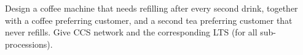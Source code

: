 \begin{exercise}
	Design a coffee machine that needs refilling after every second drink, together with a coffee preferring customer, and a second tea preferring customer that never refills. Give CCS network and the corresponding LTS (for all sub-processions).
\end{exercise}










	



